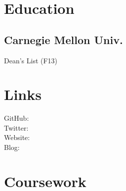 \documentclass[]{deedy-resume-openfont}
\begin{document}
%
%
\lastupdated

%
%



%
%

\begin{minipage}[t]{0.33\textwidth} 


\section{Education} 

\subsection{Carnegie Mellon Univ.}
Dean's List (F13) \\
\sectionsep


\section{Links} 
GitHub: \href{https://github.com/Z1MM32M4N}{} \\
Twitter:  \href{https://twitter.com/Z1MM32M4N}{} \\
Website:  \href{http://www.zimmerman.io}{} \\
Blog:  \href{http://blog.zimmerman.io}{} \\
\sectionsep


\section{Coursework}

\end{minipage}
\end{document}
